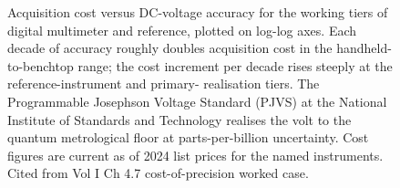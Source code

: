 \begin{figure}[ht]
\caption[DMM tier cost-of-precision]{Acquisition cost versus DC-voltage
accuracy for the working tiers of digital multimeter and reference,
plotted on log-log axes. Each decade of accuracy roughly doubles
acquisition cost in the handheld-to-benchtop range; the cost increment
per decade rises steeply at the reference-instrument and primary-
realisation tiers. The Programmable Josephson Voltage Standard (PJVS)
at the National Institute of Standards and Technology realises the
volt to the quantum metrological floor at parts-per-billion uncertainty.
Cost figures are current as of 2024 list prices for the named
instruments. Cited from Vol I Ch 4.7 cost-of-precision worked case.}
\label{fig:vol01:ch04:dmm-tiers}
\end{figure}
